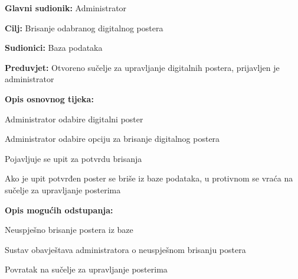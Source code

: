 					\noindent {}
					\begin{packed_item}
						
						\item \textbf{Glavni sudionik: } Administrator
						\item  \textbf{Cilj:} Brisanje odabranog digitalnog postera
						\item  \textbf{Sudionici:} Baza podataka
						\item  \textbf{Preduvjet:} Otvoreno sučelje za upravljanje digitalnih postera, prijavljen je administrator
						\item  \textbf{Opis osnovnog tijeka:}
						
						\item[] \begin{packed_enum}
							
							\item Administrator odabire digitalni poster
							\item Administrator odabire opciju za brisanje digitalnog postera
							\item Pojavljuje se upit za potvrdu brisanja
							\item Ako je upit potvrđen poster se briše iz baze podataka, u protivnom se vraća na sučelje za upravljanje posterima
							\item 
						\end{packed_enum}
						
						\item  \textbf{Opis mogućih odstupanja:}
						
						\item[] \begin{packed_item}
							
							\item[4.a] Neuspješno brisanje postera iz baze
							\item[] \begin{packed_enum}
								
								\item Sustav obavještava administratora o neuspješnom brisanju postera
								\item Povratak na sučelje za upravljanje posterima
							\end{packed_enum}
							
						\end{packed_item}
					\end{packed_item}
					
